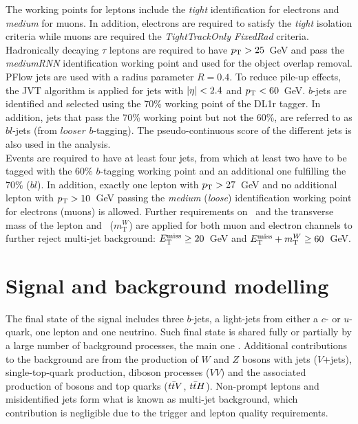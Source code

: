 The working points for leptons include the \textit{tight} identification for electrons and \textit{medium} for muons. In addition, electrons are required to satisfy the \textit{tight} isolation criteria while muons are required the \textit{TightTrackOnly FixedRad} criteria. Hadronically decaying $\tau$ leptons are required to have $p_{\text{T}}>25$~GeV and pass the \textit{mediumRNN} identification working point and used for the object overlap removal.\\

PFlow jets are used with a radius parameter $R=0.4$. To reduce pile-up effects, the JVT algorithm is applied for jets with $\abs{\eta}<2.4$ and $p_{\text{T}}<60$~GeV.%
$b$-jets are identified and selected using the 70\% working point of the DL1r tagger. In addition, jets that pass the 70\% working point but not the 60\%, are referred to as $bl$-jets (from $looser$ $b$-tagging). The pseudo-continuous score of the different jets is also used in the analysis.\\

Events are required to have at least four jets, from which at least two have to be tagged with the 60\% $b$-tagging working point and an additional one fulfilling the 70\% ($bl$). In addition, exactly one lepton with $p_{\text{T}}>27$~GeV and no additional lepton with $p_{\text{T}}>10$~GeV passing the \textit{medium} (\textit{loose}) identification working point for electrons (muons) is allowed. Further requirements on \MET\ and the transverse mass of the lepton and \MET\ ($m_{\text{T}}^W$) are applied for both muon and electron channels to further reject multi-jet background: $E_{\text{T}}^{\text{miss}}\geq20$~GeV and $E_{\text{T}}^{\text{miss}}+m_{\text{T}}^W\geq60$~GeV.\\

\section{Signal and background modelling}

The final state of the signal includes three $b$-jets, a light-jets from either a $c$- or $u$-quark, one lepton and one neutrino. Such final state is shared fully or partially by a large number of background processes, the main one \ttjets. Additional contributions to the background are from the production of $W$ and $Z$ bosons with jets ($V$+jets), single-top-quark production, diboson processes ($VV$) and the associated production of bosons and top quarks ($t\bar{t} V$, $t\bar{t} H$). Non-prompt leptons and misidentified jets form what is known as multi-jet background, which contribution is negligible due to the trigger and lepton quality requirements.\\

